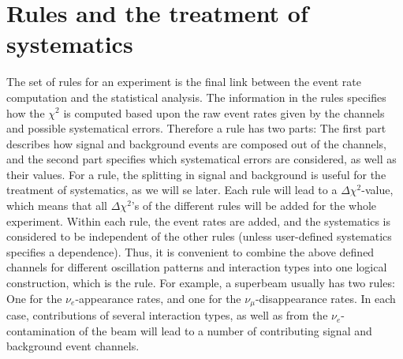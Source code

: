 \section{Rules and the treatment of systematics}
\label{sec:rules}

The set of rules for an experiment is the final 
link between the event rate computation and the statistical analysis. 
The information in the rules
specifies how the $\chi^2$ is computed based upon the raw event rates 
given by the channels and possible systematical errors. 
Therefore a rule has two parts: The first part describes how signal and 
background events are composed out of the channels, and the second part
specifies which systematical errors are considered, as well as their values.
%
For a rule, the splitting
in signal and background is useful for the treatment of systematics, as we will se later. Each rule will lead to a $\Delta \chi^2$-value,
which means that all $\Delta \chi^2$'s of the different rules will be added
for the whole experiment. Within each rule, the event rates are added, and
the systematics is considered to be independent of the other rules (unless user-defined
systematics specifies a dependence).
Thus, it is convenient to combine the above defined channels for different
oscillation patterns and interaction types into one logical construction,
which is the rule. For example, a superbeam usually has two rules: One for
the $\nu_e$-appearance rates, and one for the $\nu_\mu$-disappearance rates.
 In each case, contributions of several interaction types, as well as from
 the $\nu_e$-contamination of the beam will lead to a number of contributing signal and background event channels.

